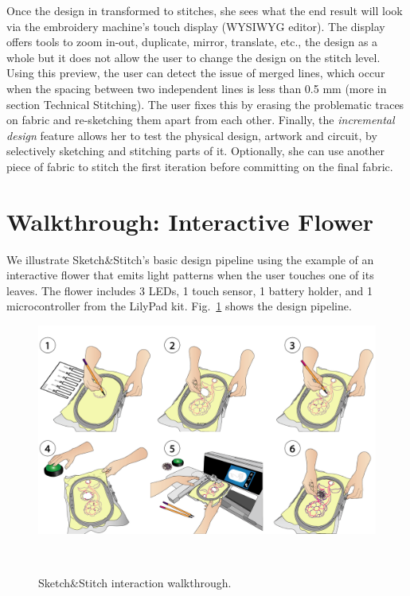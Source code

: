 \documentclass[header.tex]{subfiles}
\begin{document}
Once the design in transformed to stitches, she sees what the end result will look via the embroidery machine's touch display (WYSIWYG editor). The display offers tools to zoom in-out, duplicate, mirror, translate, etc., the design as a whole but it does not allow the user to change the design on the stitch level. Using this preview, the user can detect the issue of merged lines, which occur when the spacing between two independent lines is less than 0.5 mm (more in section Technical Stitching). The user fixes this by erasing the problematic traces on fabric and re-sketching them apart from each other. Finally, the \textit{incremental design} feature allows her to test the physical design, artwork and circuit, by selectively sketching and stitching parts of it. Optionally, she can use another piece of fabric to stitch the first iteration before committing on the final fabric.





\section{Walkthrough: Interactive Flower}


We illustrate Sketch\&Stitch's basic design pipeline using the example of an interactive flower that emits light patterns when the user touches one of its leaves. The flower includes 3 LEDs, 1 touch sensor, 1 battery holder, and 1 microcontroller 
from the LilyPad kit. Fig.\ \ref{fig:Walkthrough} shows the design pipeline.

\begin{figure} 
\centering
  \includegraphics[width=0.9\columnwidth]{figures/Walkthrough}
  \caption{Sketch\&Stitch interaction walkthrough.}~\label{fig:Walkthrough}
  \vspace{-1.5em}
\end{figure}
\end{document}
